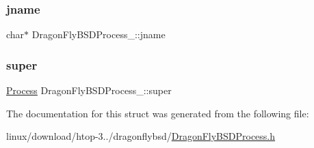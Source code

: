 \subsubsection{\texorpdfstring{jname}{jname}}
{\footnotesize\ttfamily char$\ast$ Dragon\+Fly\+B\+S\+D\+Process\+\_\+\+::jname}

\mbox{\label{structDragonFlyBSDProcess___acc7b43394aa423b2254c426f882165a2}} 
\subsubsection{\texorpdfstring{super}{super}}
{\footnotesize\ttfamily \hyperlink{Process_8h_a20673e8fa40981a168bf0e196c4cef3b}{Process} Dragon\+Fly\+B\+S\+D\+Process\+\_\+\+::super}



The documentation for this struct was generated from the following file\+:\begin{DoxyCompactItemize}
\item 
linux/download/htop-\/3../dragonflybsd/\hyperlink{DragonFlyBSDProcess_8h}{Dragon\+Fly\+B\+S\+D\+Process.\+h}\end{DoxyCompactItemize}
